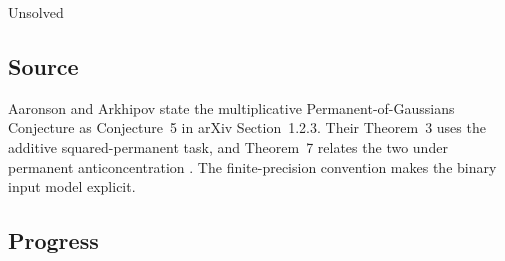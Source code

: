 Unsolved

\subsection*{Source}

Aaronson and Arkhipov state the multiplicative Permanent-of-Gaussians Conjecture as Conjecture~5 in arXiv Section~1.2.3.
Their Theorem~3 uses the additive squared-permanent task, and Theorem~7 relates the two under permanent anticoncentration .
The finite-precision convention makes the binary input model explicit.

\subsection*{Progress}

